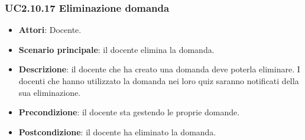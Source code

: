 \subsubsection{UC2.10.17 Eliminazione domanda}
\begin{itemize}
\item \textbf{Attori}: Docente.
\item \textbf{Scenario principale}: il docente elimina la domanda.
\item \textbf{Descrizione}: il docente che ha creato una domanda deve poterla eliminare. I docenti che hanno utilizzato la domanda nei loro quiz saranno notificati della sua eliminazione.
\item \textbf{Precondizione}: il docente sta gestendo le proprie domande.
\item \textbf{Postcondizione}: il docente ha eliminato la domanda.
\end{itemize}
